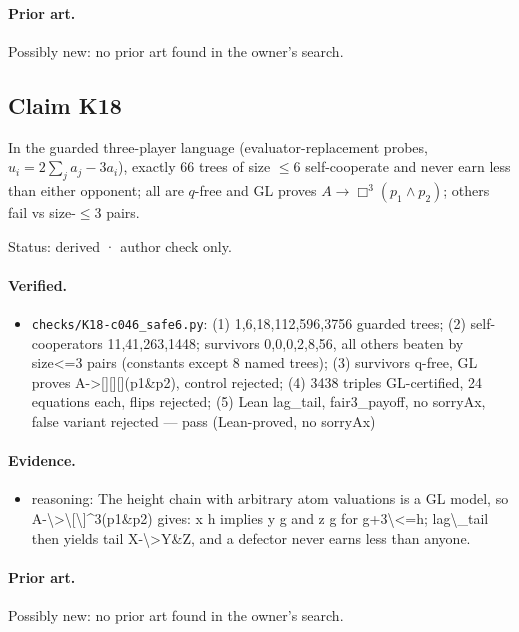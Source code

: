 \documentclass{article}
\begin{document}
\paragraph{Prior art.} Possibly new: no prior art found in the owner's search.

\subsection*{Claim K18}

In the guarded three-player language (evaluator-replacement probes, $u_i=2\sum_j a_j-3a_i$), exactly 66 trees of size $\le6$ self-cooperate and never earn less than either opponent; all are $q$-free and GL proves $A\to\Box^3(p_1\land p_2)$; others fail vs size-$\le3$ pairs.

Status: derived · author check only.

\paragraph{Verified.}
\begin{itemize}
\item \texttt{checks/K18-c046\_safe6.py}: (1) 1,6,18,112,596,3756 guarded trees; (2) self-cooperators 11,41,263,1448; survivors 0,0,0,2,8,56, all others beaten by size\textless{}=3 pairs (constants except 8 named trees); (3) survivors q-free, GL proves A-\textgreater{}[][][](p1\&p2), control rejected; (4) 3438 triples GL-certified, 24 equations each, flips rejected; (5) Lean lag\_tail, fair3\_payoff, no sorryAx, false variant rejected --- pass (Lean-proved, no sorryAx)
\end{itemize}

\paragraph{Evidence.}
\begin{itemize}
\item reasoning: The height chain with arbitrary atom valuations is a GL model, so A-\textbackslash{}\textgreater{}\textbackslash{}[\textbackslash{}]\textasciicircum{}3(p1\&p2) gives: x h implies y g and z g for g+3\textbackslash{}\textless{}=h; lag\textbackslash{}\_tail then yields tail X-\textbackslash{}\textgreater{}Y\&Z, and a defector never earns less than anyone.
\end{itemize}

\paragraph{Prior art.} Possibly new: no prior art found in the owner's search.
\end{document}
